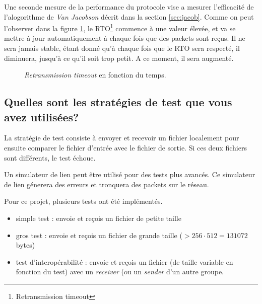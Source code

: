 \documentclass[10pt,a4paper]{article}
\begin{document}
Une seconde mesure de la performance du protocole vise a mesurer l'efficacité de l'alogorithme de \textit{Van Jacobson} décrit dans la section \ref{sec:jacob}. Comme on peut l'observer dans la figure \ref{fig:perf3}, le RTO\footnote{Retransmission timeout} commence à une valeur élevée, et va se mettre à jour automatiquement à chaque fois que des packets sont reçus. Il ne sera jamais stable, étant donné qu'à chaque fois que le RTO sera respecté, il diminuera, jusqu'à ce qu'il soit trop petit. A ce moment, il sera augmenté.

\begin{figure}[!h]
\centering
{}

\caption{\textit{Retransmission timeout} en fonction du temps.}
\label{fig:perf3}
\end{figure}

\subsection{Quelles sont les stratégies de test que vous avez utilisées?}
La stratégie de test consiste à envoyer et recevoir un fichier localement pour ensuite comparer le fichier d'entrée avec le fichier de sortie. Si ces deux fichiers sont différents, le test échoue.

Un simulateur de lien peut être utilisé pour des tests plus avancés. Ce simulateur de lien génerera des erreurs et tronquera des packets sur le réseau. 

Pour ce projet, plusieurs tests ont été implémentés.
\begin{itemize}
	\item simple test : envoie et reçois un fichier de petite taille
	\item gros test : envoie et reçois un fichier de grande taille ($>256\cdot512=131072$ bytes)
	\item test d'interopérabilité : envoie et reçois un fichier (de taille variable en fonction du test) avec un \textit{receiver} (ou un \textit{sender} d'un autre groupe.
\end{itemize}
\end{document}

